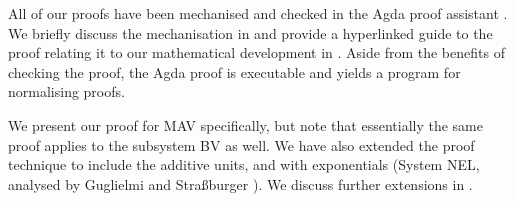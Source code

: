 All of our proofs have been mechanised and checked in the Agda proof assistant \cite{Agda264}. We briefly discuss the mechanisation in  and provide a hyperlinked guide to the proof relating it to our mathematical development in . Aside from the benefits of checking the proof, the Agda proof is executable and yields a program for normalising proofs.

We present our proof for MAV specifically, but note that essentially the same proof applies to the subsystem BV as well. We have also extended the proof technique to include the additive units, and with exponentials (System NEL, analysed by Guglielmi and Stra{\ss}burger \cite{Burger_2011,GuglielmiS11}). We discuss further extensions in .
